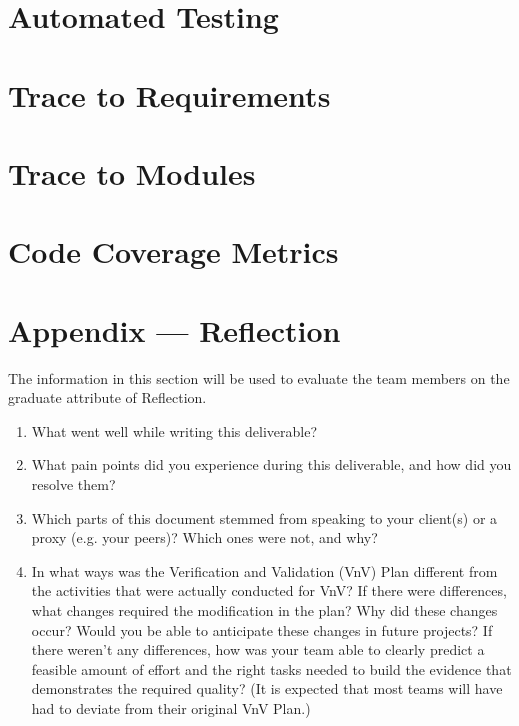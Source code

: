 \documentclass[12pt, titlepage]{article}
\begin{document}
\section{Automated Testing}
		
\section{Trace to Requirements}
		
\section{Trace to Modules}		

\section{Code Coverage Metrics}




\newpage{}
\section*{Appendix --- Reflection}

The information in this section will be used to evaluate the team members on the
graduate attribute of Reflection.



\begin{enumerate}
  \item What went well while writing this deliverable? 
  \item What pain points did you experience during this deliverable, and how
    did you resolve them?
  \item Which parts of this document stemmed from speaking to your client(s) or
  a proxy (e.g. your peers)? Which ones were not, and why?
  \item In what ways was the Verification and Validation (VnV) Plan different
  from the activities that were actually conducted for VnV?  If there were
  differences, what changes required the modification in the plan?  Why did
  these changes occur?  Would you be able to anticipate these changes in future
  projects?  If there weren't any differences, how was your team able to clearly
  predict a feasible amount of effort and the right tasks needed to build the
  evidence that demonstrates the required quality?  (It is expected that most
  teams will have had to deviate from their original VnV Plan.)
\end{enumerate}
\end{document}
